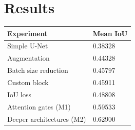 \documentclass[11pt]{article}
\begin{document}
\begin{multicols}{2}


      \label{sec:results}
      \section{Results}

      \begin{table}[H]
            \label{tab:results}
            \centering
            \setlength{\tabcolsep}{3pt}
            \begin{tabularx}{\linewidth}{lY}
                \toprule
                Experiment & Mean IoU \\
                \midrule
                Simple U-Net & 0.38328 \\
                Augmentation & 0.44328 \\
                Batch size reduction & 0.45797 \\
                Custom block & 0.45911 \\
                IoU loss & 0.48808 \\
                Attention gates (M1) & 0.59533 \\
                Deeper architectures (M2) & 0.62900 \\
                \bottomrule
            \end{tabularx}
      \end{table}


\end{multicols}
\end{document}
